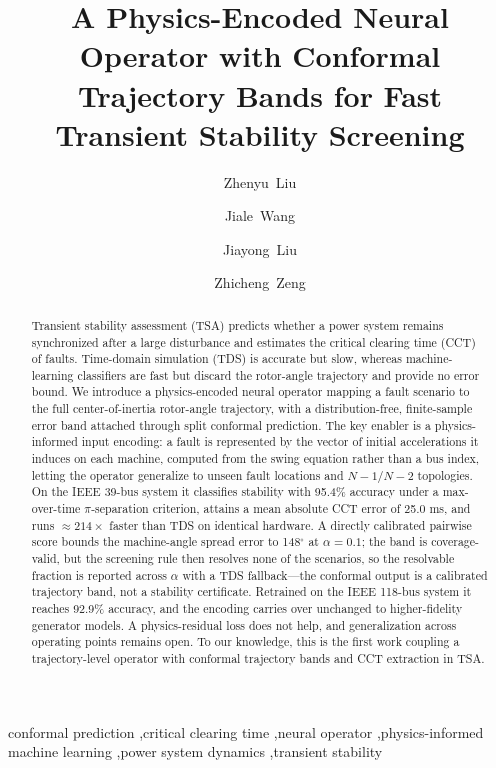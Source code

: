 \documentclass[5p,times]{elsarticle}
\newcommand{\pctACC}{95.4\%}          %
\newcommand{\pctACCb}{92.9\%}         %
\newcommand{\ccterr}{25.0}            %
\newcommand{\pairq}{148}              %
\newcommand{\timSU}{214}              %
\begin{document}
\begin{frontmatter}

\title{A Physics-Encoded Neural Operator with Conformal Trajectory Bands for Fast Transient Stability Screening}

\author[1]{Zhenyu~Liu}
\author[1]{Jiale~Wang}
\author[1]{Jiayong~Liu}
\author[1]{Zhicheng~Zeng}

\begin{abstract}
Transient stability assessment (TSA) predicts whether a power system remains synchronized
after a large disturbance and estimates the critical clearing time (CCT) of faults. Time-domain
simulation (TDS) is accurate but slow, whereas machine-learning classifiers are fast but discard
the rotor-angle trajectory and provide no error bound. We introduce a physics-encoded neural
operator mapping a fault scenario to the full center-of-inertia rotor-angle trajectory, with a
distribution-free, finite-sample error band attached through split conformal prediction. The key
enabler is a physics-informed input encoding: a fault is represented by the vector of initial
accelerations it induces on each machine, computed from the swing equation rather than a bus
index, letting the operator generalize to unseen fault locations and $N{-}1$/$N{-}2$ topologies.
On the IEEE 39-bus system it classifies stability with \pctACC{} accuracy under a max-over-time
$\pi$-separation criterion, attains a mean absolute CCT error of \ccterr{} ms, and runs
$\approx\timSU{}\times$ faster than TDS on identical hardware. A directly calibrated pairwise
score bounds the machine-angle spread error to \pairq{}$^\circ$ at $\alpha{=}0.1$; the band is
coverage-valid, but the screening rule then resolves none of the scenarios, so the resolvable
fraction is reported across $\alpha$ with a TDS fallback---the conformal output is a calibrated
trajectory band, not a stability certificate. Retrained on the IEEE 118-bus system it reaches
\pctACCb{} accuracy, and the encoding carries over unchanged to higher-fidelity generator
models. A physics-residual loss does not help, and generalization across operating points remains
open. To our knowledge, this is the first work coupling a trajectory-level operator with
conformal trajectory bands and CCT extraction in TSA.
\end{abstract}

\begin{keyword}
conformal prediction \sep critical clearing time \sep neural operator \sep physics-informed
machine learning \sep power system dynamics \sep transient stability
\end{keyword}

\end{frontmatter}
\end{document}
